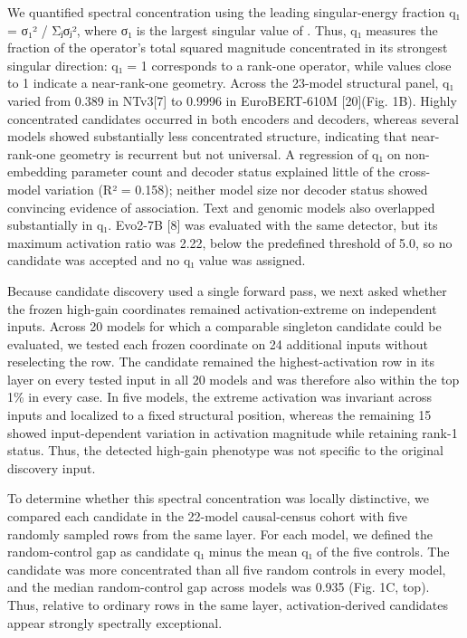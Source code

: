 \documentclass[11pt]{article}
\begin{document}
We quantified spectral concentration using the leading singular-energy fraction q₁ = σ₁² / Σⱼσⱼ², where σ₁ is the largest singular value of . Thus, q₁ measures the fraction of the operator’s total squared magnitude concentrated in its strongest singular direction: q₁ = 1 corresponds to a rank-one operator, while values close to 1 indicate a near-rank-one geometry. Across the 23-model structural panel, q₁ varied from 0.389 in NTv3[7] to 0.9996 in EuroBERT-610M [20](Fig. 1B). Highly concentrated candidates occurred in both encoders and decoders, whereas several models showed substantially less concentrated structure, indicating that near-rank-one geometry is recurrent but not universal. A regression of q₁ on non-embedding parameter count and decoder status explained little of the cross-model variation (R² = 0.158); neither model size nor decoder status showed convincing evidence of association. Text and genomic models also overlapped substantially in q₁. Evo2-7B [8] was evaluated with the same detector, but its maximum activation ratio was 2.22, below the predefined threshold of 5.0, so no candidate was accepted and no q₁ value was assigned.

Because candidate discovery used a single forward pass, we next asked whether the frozen high-gain coordinates remained activation-extreme on independent inputs. Across 20 models for which a comparable singleton candidate could be evaluated, we tested each frozen coordinate on 24 additional inputs without reselecting the row. The candidate remained the highest-activation row in its layer on every tested input in all 20 models and was therefore also within the top 1\% in every case. In five models, the extreme activation was invariant across inputs and localized to a fixed structural position, whereas the remaining 15 showed input-dependent variation in activation magnitude while retaining rank-1 status. Thus, the detected high-gain phenotype was not specific to the original discovery input.

To determine whether this spectral concentration was locally distinctive, we compared each candidate in the 22-model causal-census cohort with five randomly sampled rows from the same layer. For each model, we defined the random-control gap as candidate q₁ minus the mean q₁ of the five controls. The candidate was more concentrated than all five random controls in every model, and the median random-control gap across models was 0.935 (Fig. 1C, top). Thus, relative to ordinary rows in the same layer, activation-derived candidates appear strongly spectrally exceptional.
\end{document}
